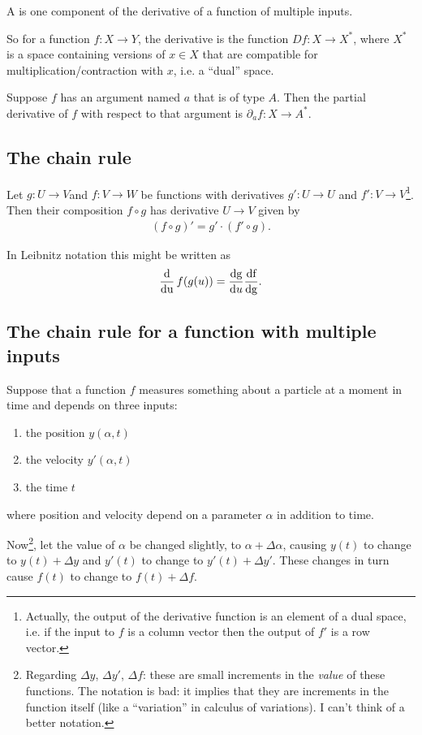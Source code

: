 \begin{definition*}
  A  is one component of the derivative of a function of multiple inputs.

  So for a function $f:X \to Y$, the derivative is the function $D f:X \to X^*$, where $X^*$ is a
  space containing versions of $x \in X$ that are compatible for multiplication/contraction with
  $x$, i.e. a ``dual'' space.

  Suppose $f$ has an argument named $a$ that is of type $A$. Then the partial derivative of $f$ with
  respect to that argument is $\partial_a{f}:X \to A^*$.
\end{definition*}

\subsection{The chain rule}

\begin{theorem}
  Let $g:U \to V$and $f:V \to W$ be functions with derivatives $g':U \to U$ and
  $f':V \to V$\footnote{Actually, the output of the derivative function is an element of a dual
    space, i.e. if the input to $f$ is a column vector then the output of $f'$ is a row
    vector.}. Then their composition $f \circ g$ has derivative $U \to V$ given by
  \begin{align*}
    (f \circ g)' = g' \cdot (f' \circ g).
  \end{align*}
\end{theorem}

In Leibnitz notation this might be written as
\begin{align*}
  \ddu f(g(u)) = \dgdu \dfdg.
\end{align*}

\subsection{The chain rule for a function with multiple inputs}

Suppose that a function $f$ measures something about a particle at a moment in time and depends on
three inputs:
\begin{enumerate}
\item the position $y(\alpha, t)$
\item the velocity $y'(\alpha, t)$
\item the time $t$
\end{enumerate}
where position and velocity depend on a parameter $\alpha$ in addition to time.

Now\footnote{Regarding $\Delta y$, $\Delta y'$, $\Delta f$: these are small increments in the
  \emph{value} of these functions. The notation is bad: it implies that they are increments in the
  function itself (like a ``variation'' in calculus of variations). I can't think of a better
  notation.}, let the value of $\alpha$ be changed slightly, to $\alpha + \Delta\alpha$, causing
$y(t)$ to change to $y(t) + \Delta y$ and $y'(t)$ to change to $y'(t) + \Delta y'$. These changes in
turn cause $f(t)$ to change to $f(t) + \Delta f$.

